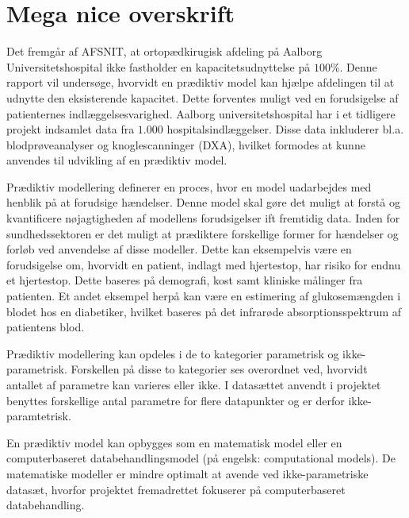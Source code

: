 \section{Mega nice overskrift}

Det fremgår af AFSNIT, at ortopædkirugisk afdeling på Aalborg Universitetshospital ikke fastholder en kapacitetsudnyttelse på $100$\%. Denne rapport vil undersøge, hvorvidt en prædiktiv model kan hjælpe afdelingen til at udnytte den eksisterende kapacitet. Dette forventes muligt ved en forudsigelse af patienternes indlæggelsesvarighed. Aalborg universitetshospital har i et tidligere projekt indsamlet data fra $1.000$ hospitalsindlæggelser. Disse data inkluderer bl.a. blodprøveanalyser og knoglescanninger (DXA), hvilket formodes at kunne anvendes til udvikling af en prædiktiv model. 

\noindent
Prædiktiv modellering definerer en proces, hvor en model uadarbejdes med henblik på at forudsige hændelser. Denne model skal gøre det muligt at forstå og kvantificere nøjagtigheden af modellens forudsigelser ift fremtidig data.\cite{Kuhn2013} 
Inden for sundhedssektoren er det muligt at prædiktere forskellige former for hændelser og forløb ved anvendelse af disse modeller. Dette kan eksempelvis være en forudsigelse om, hvorvidt en patient, indlagt med hjertestop, har risiko for endnu et hjertestop. Dette baseres på demografi, kost samt kliniske målinger fra patienten. Et andet eksempel herpå kan være en estimering af glukosemængden i blodet hos en diabetiker, hvilket baseres på det infrarøde absorptionsspektrum af patientens blod.\cite{Hastie2008}

\noindent
Prædiktiv modellering kan opdeles i de to kategorier parametrisk og ikke-parametrisk. Forskellen på disse to kategorier ses overordnet ved, hvorvidt antallet af parametre kan varieres eller ikke. I datasættet anvendt i projektet benyttes forskellige antal parametre for flere datapunkter og er derfor ikke-paramtetrisk.\cite{Sheskin2000}

\noindent
En prædiktiv model kan opbygges som en matematisk model eller en computerbaseret databehandlingsmodel (på engelsk: computational models). De matematiske modeller er mindre optimalt at avende ved ikke-parametriske datasæt, hvorfor projektet fremadrettet fokuserer på computerbaseret databehandling. \cite{Sheskin2000} 